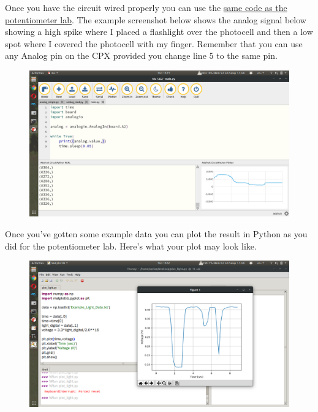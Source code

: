 Once you have the
circuit wired properly you can use
the \href{https://github.com/cmontalvo251/Microcontrollers/blob/master/Circuit_Playground/CircuitPython/Analog/analog_simple.py}{same
code as the potentiometer lab}. The example screenshot below shows the
analog signal below showing a high spike where I placed a flashlight
over the photocell and then a low spot where I covered the photocell
with my finger. Remember that you can use any Analog pin on the CPX
provided you change line 5 to the same pin. 

\begin{figure}[H]
  \begin{center}
    \includegraphics[width=\textwidth]{Figures/photocell_mu.png}
  \end{center}
\end{figure}
Once you’ve gotten some example data you can plot the result in Python as you did for the potentiometer lab. Here’s what your plot may look like.
\begin{figure}[H]
  \begin{center}
    \includegraphics[width=\textwidth]{Figures/photocell_plots.png}
  \end{center}
\end{figure}
